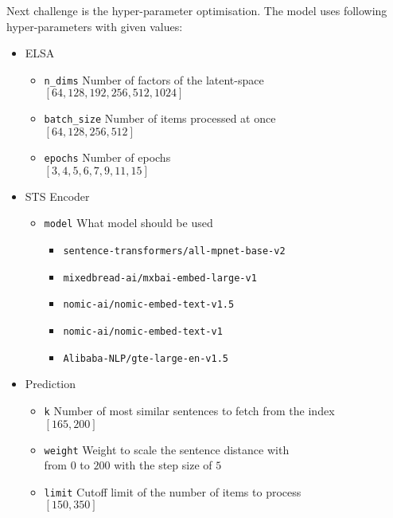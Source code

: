 \documentclass{article}
\begin{document}
Next challenge is the hyper-parameter optimisation. The model uses following hyper-parameters with given values:
\begin{itemize}
    \item ELSA \begin{itemize}
        \item \texttt{n\_dims\phantom{\ \ \ \ }} Number of factors of the latent-space\\
        \phantom{\ \ \ \ }$[64, 128, 192, 256, 512, 1024]$
        \item \texttt{batch\_size} Number of items processed at once\\
        \phantom{\ \ \ \ }$[64, 128, 256, 512]$
        \item \texttt{epochs\phantom{\ \ \ \ }} Number of epochs\\
        \phantom{\ \ \ \ }$[3, 4, 5, 6, 7, 9, 11, 15]$
    \end{itemize}
    \item STS Encoder \begin{itemize}
        \item \texttt{model\phantom{\ \ \ \ \ }} What model should be used \begin{itemize}
            \item \texttt{sentence-transformers/all-mpnet-base-v2}\cite{sbert}
            \item \texttt{mixedbread-ai/mxbai-embed-large-v1}\cite{mxbai1, mxbai2}
            \item \texttt{nomic-ai/nomic-embed-text-v1.5}\cite{nomic}
            \item \texttt{nomic-ai/nomic-embed-text-v1}\cite{nomic}
            \item \texttt{Alibaba-NLP/gte-large-en-v1.5}\cite{ali}
        \end{itemize}
    \end{itemize}
    \item Prediction \begin{itemize}
        \item \texttt{k\phantom{\ \ \ \ \ \ \ \ \ }} Number of most similar sentences to fetch from the index\\
        \phantom{\ \ \ \ }$[165, 200]$
        \item \texttt{weight\phantom{\ \ \ \ }} Weight to scale the sentence distance with\\
        \phantom{\ \ \ \ }from $0$ to $200$ with the step size of $5$
        \item \texttt{limit\phantom{\ \ \ \ \ }} Cutoff limit of  the number of items to process\\
        \phantom{\ \ \ \ }$[150, 350]$
    \end{itemize}
\end{itemize}
\end{document}
